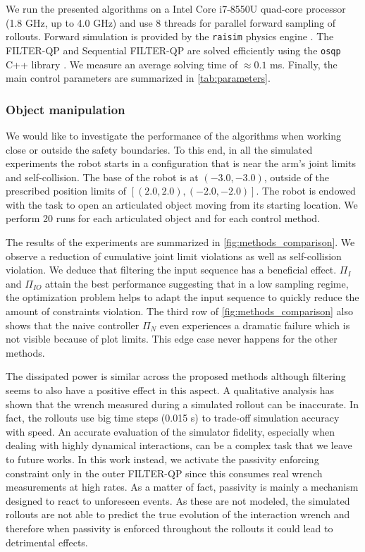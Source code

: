 We run the presented algorithms on a Intel Core i7-8550U quad-core processor (1.8 GHz, up to 4.0 GHz) and use 8 threads for parallel forward sampling of rollouts. Forward simulation is provided by the \texttt{raisim} physics engine \cite{raisim}. The FILTER-QP and Sequential FILTER-QP are solved efficiently using the \texttt{osqp} C++ library \cite{osqp}. We measure an average solving time of $\approx 0.1$ ms. Finally, the main control parameters are summarized in \tab \ref{tab:parameters}.  


\vspace{0.3cm}
\subsubsection{Object manipulation}
We would like to investigate the performance of the algorithms when working close or outside the safety boundaries. To this end, in all the simulated experiments the robot starts in a configuration that is near the arm's joint limits and self-collision. The base of the robot is at $(-3.0, -3.0)$, outside of the prescribed position limits of $[(2.0, 2.0), (-2.0, -2.0)]$. The robot is endowed with the task to open an articulated object moving from its starting location. We perform 20 runs for each articulated object and for each control method.

The results of the experiments are summarized in \fig \ref{fig:methods_comparison}. We observe a reduction of cumulative joint limit violations as well as self-collision violation. We deduce that filtering the input sequence has a beneficial effect. $\Pi_{I}$ and $\Pi_{IO}$ attain the best performance suggesting that in a low sampling regime, the optimization problem helps to adapt the input sequence to quickly reduce the amount of constraints violation. The third row of \fig \ref{fig:methods_comparison} also shows that the naive controller $\Pi_{N}$ even experiences a dramatic failure which is not visible because of plot limits. This edge case never happens for the other methods. 

The dissipated power is similar across the proposed methods although filtering seems to also have a positive effect in this aspect. A qualitative analysis has shown that the wrench measured during a simulated rollout can be inaccurate. In fact, the rollouts use big time steps (0.015 s) to trade-off simulation accuracy with speed. An accurate evaluation of the simulator fidelity, especially when dealing with highly dynamical interactions, can be a complex task that we leave to future works. In this work instead, we activate the passivity enforcing constraint only in the outer FILTER-QP since this consumes real wrench measurements at high rates. As a matter of fact, passivity is mainly a mechanism designed to react to unforeseen events. As these are not modeled, the simulated rollouts are not able to predict the true evolution of the interaction wrench and therefore when passivity is enforced throughout the rollouts it could lead to detrimental effects.

